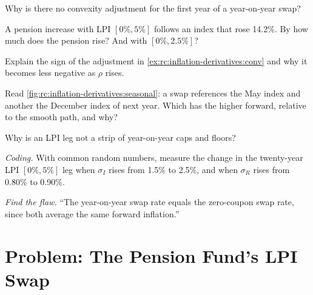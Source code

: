 \begin{exercise}[$\star$]\label{exo:rc:inflation-derivatives:2}
Why is there no convexity adjustment for the first year of a year-on-year swap?
\end{exercise}

\begin{exercise}[$\star$]\label{exo:rc:inflation-derivatives:3}
A pension increase with LPI $[0\%,5\%]$ follows an index that rose 14.2\%. By how much
does the pension rise? And with $[0\%,2.5\%]$?
\end{exercise}

\begin{exercise}[$\star\star$]\label{exo:rc:inflation-derivatives:4}
Explain the sign of the adjustment in \cref{ex:rc:inflation-derivatives:conv} and why it
becomes less negative as $\rho$ rises.
\end{exercise}

\begin{exercise}[$\star\star$]\label{exo:rc:inflation-derivatives:5}
Read \cref{fig:rc:inflation-derivatives:seasonal}: a swap references the May index and
another the December index of next year. Which has the higher forward, relative to the
smooth path, and why?
\end{exercise}

\begin{exercise}[$\star\star$]\label{exo:rc:inflation-derivatives:6}
Why is an LPI leg not a strip of year-on-year caps and floors?
\end{exercise}

\begin{exercise}[$\star\star\star$]\label{exo:rc:inflation-derivatives:7}
\emph{Coding.} With common random numbers, measure the change in the twenty-year LPI
$[0\%,5\%]$ leg when $\sigma_I$ rises from 1.5\% to 2.5\%, and when $\sigma_R$ rises from 0.80\% to
0.90\%.
\end{exercise}

\begin{exercise}[$\star\star\star$]\label{exo:rc:inflation-derivatives:8}
\emph{Find the flaw.} ``The year-on-year swap rate equals the zero-coupon swap rate,
since both average the same forward inflation.''
\end{exercise}

\section{Problem: The Pension Fund's LPI Swap}

